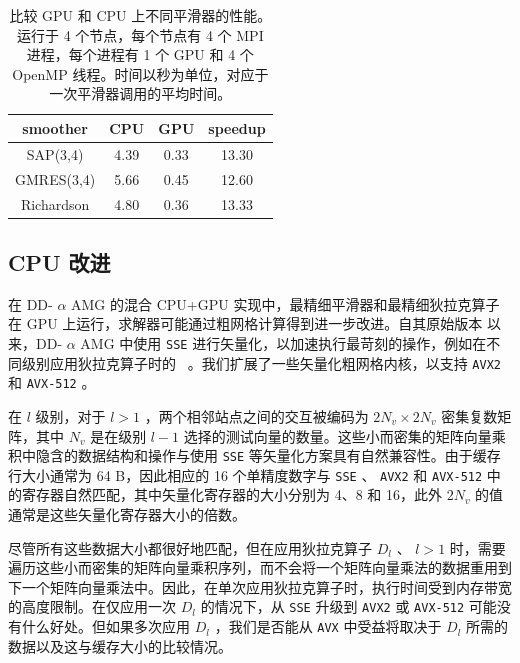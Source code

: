 \documentclass[5p,times,a4paper,fleqn]{cas-dc}
\begin{document}
   \begin{table}
    \centering
    \caption{比较 GPU 和 CPU 上不同平滑器的性能。运行于 4 个节点，每个节点有 4 个 MPI 进程，每个进程有 1 个 GPU 和 4 个 OpenMP 线程。时间以秒为单位，对应于一次平滑器调用的平均时间。  }
    \label{tab:comp-cpu-gpu}
    \begin{tabular}{cccc}
    \hline
    smoother   & CPU     & GPU     & speedup    \\  \hline
    SAP(3,4)   & 4.39    & 0.33    & 13.30       \\ 
    GMRES(3,4) & 5.66    & 0.45    & 12.60      \\ 
    Richardson & 4.80    & 0.36    & 13.33      \\  \hline
    \end{tabular}
\end{table}     

   \subsection{CPU 改进  }       \label{subsect:avx2_on_coarser_levels_results}     

在 DD-    $\alpha$    AMG    \cite{wuppertalGPUDDalphaAMG}    的混合 CPU+GPU 实现中，最精细平滑器和最精细狄拉克算子在 GPU 上运行，求解器可能通过粗网格计算得到进一步改进。自其原始版本    \cite{wuppertalDDalphaAMG}    以来，DD-    $\alpha$    AMG 中使用    \texttt{SSE}    进行矢量化，以加速执行最苛刻的操作，例如在不同级别应用狄拉克算子时的 \ 。我们扩展了一些矢量化粗网格内核，以支持    \texttt{AVX2}    和    \texttt{AVX-512}   。  

在    $l$    级别，对于    $l>1$    ，两个相邻站点之间的交互被编码为    $2N_{v} \times 2N_{v}$    密集复数矩阵，其中    $N_{v}$    是在级别    $l-1$    选择的测试向量的数量。这些小而密集的矩阵向量乘积中隐含的数据结构和操作与使用    \texttt{SSE}    等矢量化方案具有自然兼容性。由于缓存行大小通常为 64 B，因此相应的 16 个单精度数字与    \texttt{SSE}    、    \texttt{AVX2}    和    \texttt{AVX-512}    中的寄存器自然匹配，其中矢量化寄存器的大小分别为 4、8 和 16，此外    $2N_{v}$    的值通常是这些矢量化寄存器大小的倍数。  

尽管所有这些数据大小都很好地匹配，但在应用狄拉克算子    $D_{l}$   、   $l>1$    时，需要遍历这些小而密集的矩阵向量乘积序列，而不会将一个矩阵向量乘法的数据重用到下一个矩阵向量乘法中。因此，在单次应用狄拉克算子时，执行时间受到内存带宽的高度限制。在仅应用一次    $D_{l}$    的情况下，从    \texttt{SSE}    升级到    \texttt{AVX2}    或    \texttt{AVX-512}    可能没有什么好处。但如果多次应用    $D_{l}$   ，我们是否能从    \texttt{AVX}    中受益将取决于    $D_{l}$    所需的数据以及这与缓存大小的比较情况。  
\end{document}
